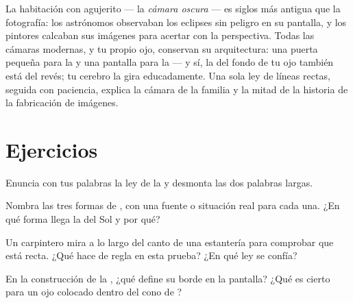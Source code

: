 \begin{remark}\label{rem:g6:light-propagation:history}
La habitación con agujerito --- la \emph{cámara oscura} --- es siglos
más antigua que la fotografía: los astrónomos observaban los eclipses
sin peligro en su pantalla, y los pintores calcaban sus
imágenes para acertar con la perspectiva. Todas las cámaras
modernas, y tu propio ojo, conservan su arquitectura: una puerta
pequeña para la  y una pantalla para la  --- y sí, la
 del fondo de tu ojo también está del revés; tu cerebro la
gira educadamente. Una sola ley de líneas rectas, seguida con
paciencia, explica la cámara de la familia y la mitad de la historia
de la fabricación de imágenes.
\end{remark}

\section{Ejercicios}

\begin{exercise}[$\star$]\label{exo:g6:light-propagation:1}
Enuncia con tus palabras la ley de la
 y desmonta las dos palabras largas.
\end{exercise}

\begin{exercise}[$\star$]\label{exo:g6:light-propagation:2}
Nombra las tres formas de , con una fuente o situación real
para cada una. ¿En qué forma llega la  del Sol y por qué?
\end{exercise}

\begin{exercise}[$\star$]\label{exo:g6:light-propagation:3}
Un carpintero mira a lo largo del canto de una estantería para
comprobar que está recta. ¿Qué hace de regla en esta prueba? ¿En qué
ley se confía?
\end{exercise}

\begin{exercise}[$\star$]\label{exo:g6:light-propagation:4}
En la construcción de la , ¿qué define su borde en la
pantalla? ¿Qué es cierto para un ojo colocado dentro del cono de
?
\end{exercise}

